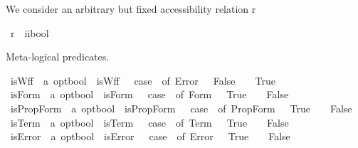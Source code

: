 \begin{isabellebody}
{}
%
\begin{isamarkuptext}%
We consider an arbitrary but fixed accessibility relation r%
\end{isamarkuptext}%
\isamarkuptrue%
\isamarkupfalse%
\ r\ {\isacharcolon}{\isacharcolon}\ {\isachardoublequoteopen}{\isacharparenleft}i{\isasymRightarrow}i{\isasymRightarrow}bool{\isacharparenright}{\isachardoublequoteclose}%
\begin{isamarkuptext}%
Meta-logical predicates.%
\end{isamarkuptext}%
\isamarkuptrue%
\isamarkupfalse%
\ isWff\ {\isacharcolon}{\isacharcolon}\ {\isachardoublequoteopen}{\isacharprime}a\ opt{\isasymRightarrow}bool{\isachardoublequoteclose}\ \ {\isachardoublequoteopen}isWff\ {\isasymphi}\ {\isasymequiv}\ case\ {\isasymphi}\ of\ Error\ {\isasympsi}\ {\isasymRightarrow}\ False\ {\isacharbar}\ {\isacharunderscore}\ {\isasymRightarrow}\ True{\isachardoublequoteclose}\isanewline
{}\isamarkupfalse%
\ isForm\ {\isacharcolon}{\isacharcolon}\ {\isachardoublequoteopen}{\isacharprime}a\ opt{\isasymRightarrow}bool{\isachardoublequoteclose}\ \ {\isachardoublequoteopen}isForm\ {\isasymphi}\ {\isasymequiv}\ case\ {\isasymphi}\ of\ Form\ {\isasympsi}\ {\isasymRightarrow}\ True\ {\isacharbar}\ {\isacharunderscore}\ {\isasymRightarrow}\ False{\isachardoublequoteclose}\isanewline
{}\isamarkupfalse%
\ isPropForm\ {\isacharcolon}{\isacharcolon}\ {\isachardoublequoteopen}{\isacharprime}a\ opt{\isasymRightarrow}bool{\isachardoublequoteclose}\ \ {\isachardoublequoteopen}isPropForm\ {\isasymphi}\ {\isasymequiv}\ case\ {\isasymphi}\ of\ PropForm\ {\isasympsi}\ {\isasymRightarrow}\ True\ {\isacharbar}\ {\isacharunderscore}\ {\isasymRightarrow}\ False{\isachardoublequoteclose}\isanewline
{}\isamarkupfalse%
\ isTerm\ {\isacharcolon}{\isacharcolon}\ {\isachardoublequoteopen}{\isacharprime}a\ opt{\isasymRightarrow}bool{\isachardoublequoteclose}\ \ {\isachardoublequoteopen}isTerm\ {\isasymphi}\ {\isasymequiv}\ case\ {\isasymphi}\ of\ Term\ {\isasympsi}\ {\isasymRightarrow}\ True\ {\isacharbar}\ {\isacharunderscore}\ {\isasymRightarrow}\ False{\isachardoublequoteclose}\isanewline
{}\isamarkupfalse%
\ isError\ {\isacharcolon}{\isacharcolon}\ {\isachardoublequoteopen}{\isacharprime}a\ opt{\isasymRightarrow}bool{\isachardoublequoteclose}\ \ {\isachardoublequoteopen}isError\ {\isasymphi}\ {\isasymequiv}\ case\ {\isasymphi}\ of\ Error\ {\isasympsi}\ {\isasymRightarrow}\ True\ {\isacharbar}\ {\isacharunderscore}\ {\isasymRightarrow}\ False{\isachardoublequoteclose}\isanewline

\end{isabellebody}

